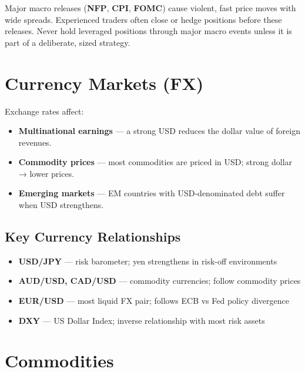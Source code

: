 \begin{warningbox}
Major macro releases (\textbf{NFP}, \textbf{CPI}, \textbf{FOMC}) cause violent, fast price moves
with wide spreads. Experienced traders often close or hedge positions before these releases.
Never hold leveraged positions through major macro events unless it is part of a deliberate,
sized strategy.
\end{warningbox}

\section{Currency Markets (FX)}

Exchange rates affect:
\begin{itemize}
  \item \textbf{Multinational earnings} — a strong USD reduces the dollar value of foreign revenues.
  \item \textbf{Commodity prices} — most commodities are priced in USD; strong dollar → lower prices.
  \item \textbf{Emerging markets} — EM countries with USD-denominated debt suffer when USD strengthens.
\end{itemize}

\subsection{Key Currency Relationships}
\begin{itemize}
  \item \textbf{USD/JPY} — risk barometer; yen strengthens in risk-off environments
  \item \textbf{AUD/USD, CAD/USD} — commodity currencies; follow commodity prices
  \item \textbf{EUR/USD} — most liquid FX pair; follows ECB vs Fed policy divergence
  \item \textbf{DXY} — US Dollar Index; inverse relationship with most risk assets
\end{itemize}

\section{Commodities}

